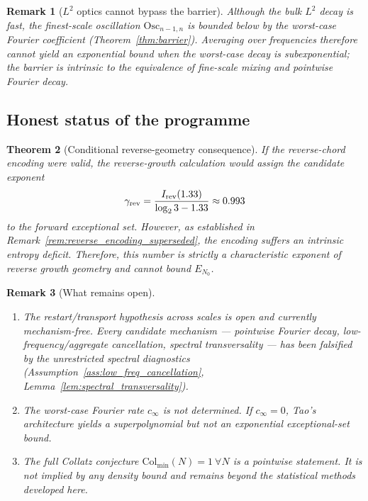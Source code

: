 \documentclass[12pt,a4paper]{article}
\newtheorem{theorem}{Theorem}[section]
\newtheorem{remark}[theorem]{Remark}
\begin{document}
\begin{remark}[$L^2$ optics cannot bypass the barrier]
Although the bulk $L^2$ decay is fast, the finest-scale oscillation
$\mathrm{Osc}_{n-1,n}$ is bounded \emph{below} by the worst-case Fourier
coefficient (Theorem~\ref{thm:barrier}). Averaging over frequencies therefore
cannot yield an exponential bound when the worst-case decay is subexponential;
the barrier is intrinsic to the equivalence of fine-scale mixing and pointwise
Fourier decay.
\end{remark}

\subsection{Honest status of the programme}

\begin{theorem}[Conditional reverse-geometry consequence]
\label{thm:final}
If the reverse-chord encoding were valid, the reverse-growth calculation
would assign the candidate exponent
\[
 \gamma_{\rm rev}
 =\frac{I_{\rm rev}(1.33)}{\log_2 3-1.33}\approx0.993
\]
to the forward exceptional set. However, as established in
Remark~\ref{rem:reverse_encoding_superseded}, the encoding suffers an intrinsic
entropy deficit. Therefore, this number is strictly a characteristic exponent of
reverse growth geometry and cannot bound $E_{N_0}$.
\end{theorem}

\begin{remark}[What remains open]
\begin{enumerate}
\item[(i)] The restart/transport hypothesis across scales is open and currently
mechanism-free. Every candidate mechanism --- pointwise Fourier decay,
low-frequency/aggregate cancellation, spectral transversality --- has been
falsified by the unrestricted spectral diagnostics
(Assumption~\ref{ass:low_freq_cancellation}, Lemma~\ref{lem:spectral_transversality}).
\item[(ii)] The worst-case Fourier rate $c_\infty$ is not determined. If
$c_\infty=0$, Tao's architecture yields a superpolynomial but not an
exponential exceptional-set bound.
\item[(iii)] The full Collatz conjecture $\mathrm{Col}_{\min}(N)=1\ \forall N$
is a pointwise statement. It is not implied by any density bound and remains
beyond the statistical methods developed here.
\end{enumerate}
\end{remark}
\end{document}
